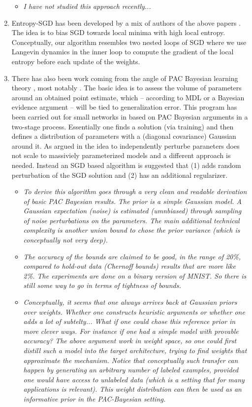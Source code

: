 \documentclass[10pt,a4paper]{article}
\begin{document}
\begin{enumerate}
\begin{itemize}
\item \textit{I have  not studied this approach recently...}
\end{itemize}
\item Entropy-SGD has been developed by a mix of authors of the above papers \cite{chaudhari2016entropy}. The idea is to bias SGD towards local minima with high local entropy. \\
Conceptually, our algorithm resembles two nested loops of SGD where we use Langevin dynamics in the inner loop to compute the gradient of the local entropy before each update of the weights.
%
\item There has also been work coming from the angle of PAC Bayesian  learning theory \cite{mcallester1999pac}, most notably  \cite{dziugaite2017computing}. The basic idea is to assess the volume of parameters around an obtained point estimate, which -- according to MDL or a Bayesian evidence argument -- will be tied to generalization error. This program has been carried out for small networks in \cite{langford2002not} based on PAC Bayesian arguments \cite{mcallester1999pac} in a two-stage process. Essentially one finds a solution (via training) and then defines a distribution of parameters with a (diagonal covariance) Gaussian around it. As argued in \cite{dziugaite2017computing} the idea to independently perturbe paraneters does not scale to massiviely parameterized models and a different approach is needed. Instead an SGD based algorithm is suggested that (1) adds  random perturbation of the SGD solution and (2) has an additional regularizer. 
\begin{itemize}
\item \textit{To derive this algorithm \cite{dziugaite2017computing} goes through a very clean and readable derivation of basic PAC Bayesian results. The prior is a simple Gaussian model. A Gaussian expectation (noise) is estimated (umnbiased) through sampling of noise perturbations on the parameters. The main additional technical complexity is another union bound to chose the prior variance (which is conceptually not very deep).}
\item \textit{The accuracy of the bounds are claimed to be good, in the range of 20\%, compared to hold-out data (Chernoff bounds) results that are more like 2\%. The experiments are done on a binary version of MNIST. So there is still some way to go in terms of tightness of bounds.}
\item \textit{Conceptually, it seems that one always arrives back at Gaussian priors over weights. Whether one constructs heuristic arguments or whether one adds a lot of subtelty... What if one could chose this reference prior in more clever ways. For instance if one had a simple model with provable accuracy? The above argument work in weight space, so one could first distill such a model into the target architecture, trying to find weights that approximate the mechanism. Notice that conceptually such transfer can happen by generating an arbitrary number of labeled examples, provided one would have access to unlabeled data (which is a setting that for many applications is relevant). This weight distribution can then be used as an informative prior in the PAC-Bayesian setting.} 

\end{itemize}
\end{enumerate}
\end{document}
